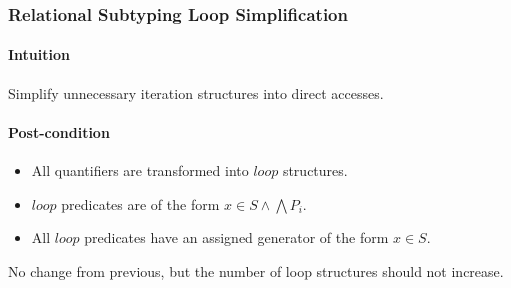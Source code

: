 \documentclass{article}
\begin{document}
\subsubsection{Relational Subtyping Loop Simplification}

\paragraph{Intuition} Simplify unnecessary iteration structures into direct accesses.

\paragraph{Post-condition}
\begin{itemize}
  \item All quantifiers are transformed into $loop$ structures.
  \item $loop$ predicates are of the form $x \in S \land \bigwedge P_i$.
  \item All $loop$ predicates have an assigned generator of the form $x \in S$.
\end{itemize}
No change from previous, but the number of loop structures should not increase.
\end{document}
